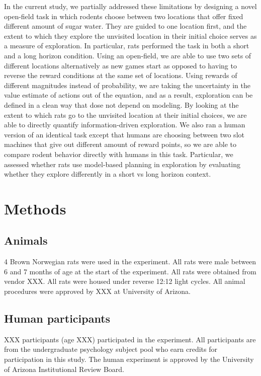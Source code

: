 \documentclass[12pt]{article}
\begin{document}
In the current study, we partially addressed these limitations by designing a novel open-field task in which rodents choose between two locations that offer fixed different amount of sugar water. They are guided to one location first, and the extent to which they explore the unvisited location in their initial choice serves as a measure of exploration. In particular, rats performed the task in both a short and a long horizon condition. Using an open-field, we are able to use two sets of different locations alternatively as new games start as opposed to having to reverse the reward conditions at the same set of locations. Using rewards of different magnitudes instead of probability, we are taking the uncertainty in the value estimate of actions out of the equation, and as a result, exploration can be defined in a clean way that dose not depend on modeling. By looking at the extent to which rats go to the unvisited location at their initial choices, we are able to directly quantify information-driven exploration. We also ran a human version of an identical task except that humans are choosing between two slot machines that give out different amount of reward points, so we are able to compare rodent behavior directly with humans in this task. Particular, we assessed whether rats use model-based planning in exploration by evaluating whether they explore differently in a short vs long horizon context. 

\section*{Methods}
\subsection*{Animals} 
4 Brown Norwegian rats were used in the experiment. All rats were male between 6 and 7 months of age at the start of the experiment. All rats were obtained from vendor XXX. All rats were housed under reverse 12:12 light cycles. All animal procedures were approved by XXX at University of Arizona.
 
\subsection*{Human participants}
XXX participants (age XXX) participated in the experiment. All participants are from the undergraduate psychology subject pool who earn credits for participation in this study. The human experiment is approved by the University of Arizona  Institutional Review Board.
\end{document}
